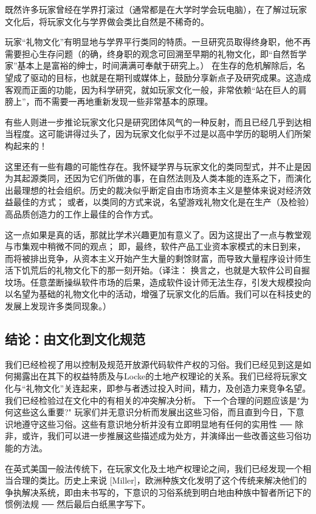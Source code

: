 既然许多玩家曾经在学界打滚过（通常都是在大学时学会玩电脑），在了解过玩家文化后，将玩家文化与学界做会类比自然是不稀奇的。

玩家“礼物文化”有明显地与学界平行类同的特质。一旦研究员取得终身职，他不再需要担心生存问题（的确，终身职的观念可回溯至早期的礼物文化，即“自然哲学家”基本上是富裕的绅士，时间满满可奉献于研究上。） 在生存的危机解除后，名望成了驱动的目标，也就是在期刊或媒体上，鼓励分享新点子及研究成果。这造成客观而正面的功能，因为科学研究，就如玩家文化一般，非常依赖“站在巨人的肩膀上”，而不需要一再地重新发现一些非常基本的原理。

有些人则进一步推论玩家文化只是研究团体风气的一种反射，而且已经几乎到达相当程度。这可能讲得过头了，因为玩家文化似乎不过是以高中学历的聪明人们所架构起来的！

这里还有一些有趣的可能性存在。我怀疑学界与玩家文化的类同型式，并不止是因为其起源类同，还因为它们所做的事，在自然法则及人类本能的连系之下，而演化出最理想的社会组织。历史的裁决似乎断定自由市场资本主义是整体来说对经济效益最佳的方式； 或者，以类同的方式来说，名望游戏礼物文化是在生产（及检验）高品质创造力的工作上最佳的合作方式。

这一点如果是真的话，那就比学术兴趣更加有意义了。因为这提出了一点与教堂观与市集观中稍微不同的观点； 即，最终，软件产品工业资本家模式的末日到来，而将被排出竞争，从资本主义开始产生大量的剩馀财富，而导致大量程序设计师生活下饥荒后的礼物文化下的那一刻开始。（译注： 换言之，也就是大软件公司自掘坟场。任意垄断操纵软件市场的后果，造成软件设计师无法生存，引发大规模投向以名望为基础的礼物文化中的活动，增强了玩家文化的后盾。我们可以在科技史的发展上发现许多类同现象。）


\subsection{结论：由文化到文化规范}
我们已经检视了用以控制及规范开放源代码软件产权的习俗。我们已经见到这是如何揭露出在其下的权益特质及与Locke的土地产权理论的关系。我们已经将玩家文化与“礼物文化”关连起来，即参与者透过投入时间，精力，及创造力来竞争名望。我们已经检验过在文化中的有相关的冲突解决分析。
下一个合理的问题应该是"为何这些这么重要?" 玩家们并无意识分析而发展出这些习俗，而且直到今日，下意识地遵守这些习俗。这些有意识地分析并没有立即明显地有任何的实用性  ──  除非，或许，我们可以进一步推展这些描述成为处方，并演绎出一些改善这些习俗功能的方法。

在英式美国一般法传统下，在玩家文化及土地产权理论之间，我们已经发现一个相当合理的类比。历史上来说 [Miller]，欧洲种族文化发明了这个传统来解决他们的争执解决系统，即由未书写的，下意识的习俗系统到明白地由种族中智者所记下的惯例法规  ──  然后最后白纸黑字写下。

